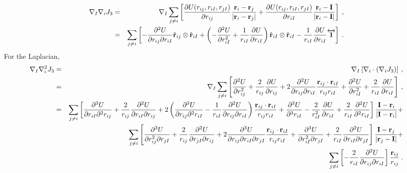 \begin{eqnarray}
\nabla_I \nabla_i J_3 & = & \nabla_I \sum_{j \neq i}
\left[\frac{\partial U(r_{ij}, r_{iI},r_{jI})}{\partial r_{ij}}
  \frac{\mathbf{r}_i - \mathbf{r}_j}{|\mathbf{r}_i - \mathbf{r}_j|} 
+ \frac{\partial U(r_{ij}, r_{iI},r_{jI})}{\partial r_{iI}}
  \frac{\mathbf{r}_i - \mathbf{I}}{|\mathbf{r}_i - \mathbf{I}|}  \right]\:, \\\nonumber 
& = & \sum_{j\neq i} \left[ -\frac{\partial^2 U}{\partial r_{ij} \partial r_{iI}} \hat{\mathbf{r}}_{ij} \otimes \hat{\mathbf{r}}_{iI} +
\left(-\frac{\partial^2 U}{\partial r_{iI}^2}  + \frac{1}{r_{iI}}\frac{\partial U}{\partial r_{iI}} \right) 
\hat{\mathbf{r}}_{iI} \otimes \hat{\mathbf{r}}_{iI} - \frac{1}{r_{iI}}\frac{\partial U}{\partial r_{iI}} \overleftrightarrow{\mathbf{1}}
\right]\:.
\end{eqnarray}
For the Laplacian,
\begin{eqnarray}
\nabla_I \nabla_i^2 J_3 & = & \nabla_I\left[\nabla_i \cdot \left(\nabla_i J_3\right)\right]\:, \\
& = & \nabla_I \sum_{j\neq i } \left[
\frac{\partial^2 U}{\partial r_{ij}^2} + \frac{2}{r_{ij}} \frac{\partial
  U}{\partial r_{ij}} + 2 \frac{\partial^2 U}{\partial r_{ij} \partial
  r_{iI}}\frac{\mathbf{r}_{ij}\cdot\mathbf{r}_{iI}}{r_{ij}r_{iI}} +\frac{\partial^2 U}{\partial
  r_{iI}^2}
+ \frac{2}{r_{iI}}\frac{\partial U}{\partial r_{iI}} \nonumber
\right]\:, \\
& = & \sum_{j\neq i } 
\left[ \frac{\partial^3 U}{\partial r_{iI} \partial^2 r_{ij}} +
\frac{2}{r_{ij}} \frac{\partial^2 U}{\partial r_{iI} \partial r_{ij}}
+ 2\left(\frac{\partial^3 U}{\partial r_{ij} \partial^2 r_{iI}} -\frac{1}{r_{iI}} \frac{\partial^2 U}{\partial r_{ij} \partial r_{iI}}\right)\frac{\mathbf{r}_{ij}\cdot\mathbf{r}_{iI}}{r_{ij}r_{iI}} + \frac{\partial^3 U}{\partial^3 r_{iI}} - \frac{2}{r_{iI}^2} \frac{\partial U}{ \partial r_{iI}} + \frac{2}{r_{iI}} \frac{\partial^2 U}{\partial^2 r_{iI}}
\right] \frac{\mathbf{I} - \mathbf{r}_i}{|\mathbf{I} - \mathbf{r}_i|} + \nonumber \\\nonumber 
 & & \sum_{j\neq i } \left[ \frac{\partial^3U}{\partial r_{ij}^2 \partial r_{jI}} + \frac{2}{r_{ij}}\frac{\partial^2 U}{\partial r_{jI} \partial r_{ij}} 
+ 2\frac{\partial^3 U}{\partial r_{ij} \partial r_{iI} \partial r_{jI}}\frac{\mathbf{r}_{ij}\cdot\mathbf{r}_{iI}}{r_{ij}r_{iI}}
+\frac{\partial^3 U}{\partial r_{iI}^2 \partial r_{jI}} + \frac{2}{r_{iI}}\frac{\partial^2 U}{\partial r_{iI} \partial r_{jI}} \right] 
\frac{\mathbf{I} - \mathbf{r}_j}{|\mathbf{r}_j - \mathbf{I}|} + \\\nonumber 
& & \sum_{j\neq i } \left[ -\frac{2}{r_{iI}}\frac{\partial^2 U}{\partial r_{ij} \partial r_{iI}}\right] \frac{\mathbf{r}_{ij}}{r_{ij}}\:.
\end{eqnarray}




